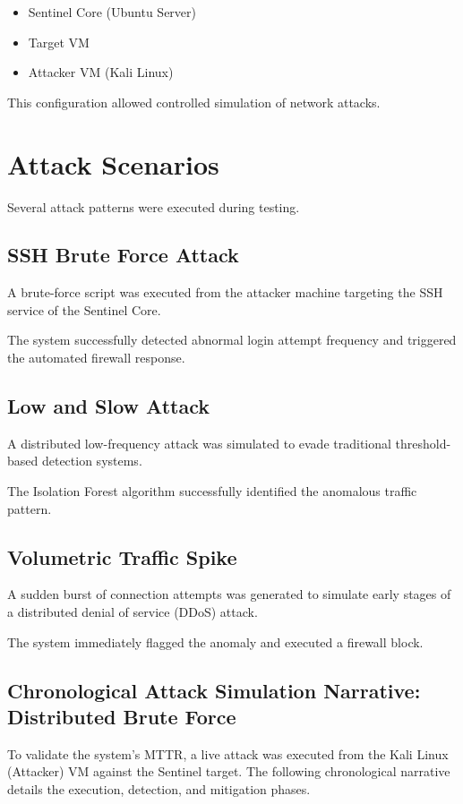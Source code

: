 \documentclass[12pt, a4paper]{report}
\begin{document}
	\begin{itemize}
		\item Sentinel Core (Ubuntu Server)
		\item Target VM
		\item Attacker VM (Kali Linux)
	\end{itemize}
	
	This configuration allowed controlled simulation of network attacks.
	
	\section{Attack Scenarios}
	
	Several attack patterns were executed during testing.
	
	\subsection{SSH Brute Force Attack}
	
	A brute-force script was executed from the attacker machine targeting the
	SSH service of the Sentinel Core.
	
	The system successfully detected abnormal login attempt frequency and
	triggered the automated firewall response.
	
	\subsection{Low and Slow Attack}
	
	A distributed low-frequency attack was simulated to evade traditional
	threshold-based detection systems.
	
	The Isolation Forest algorithm successfully identified the anomalous
	traffic pattern.
	
	\subsection{Volumetric Traffic Spike}
	
	A sudden burst of connection attempts was generated to simulate early
	stages of a distributed denial of service (DDoS) attack.
	
	The system immediately flagged the anomaly and executed a firewall block.
	
	\subsection{Chronological Attack Simulation Narrative: Distributed Brute Force}
	To validate the system's MTTR, a live attack was executed from the Kali Linux (Attacker) VM against the Sentinel target. The following chronological narrative details the execution, detection, and mitigation phases.
	
\end{document}
